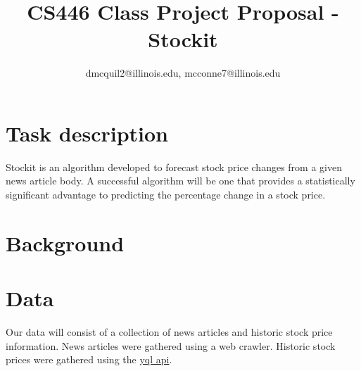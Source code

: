 \documentclass[11pt,letterpaper]{article}
\newcommand{\blue}[1]{\textcolor{RoyalBlue}{#1}}
\newcommand{\instructions}[1]{\blue{\textit{#1}}}
\renewcommand{\instructions}[1]{}
\begin{document}
\title{CS446 Class Project Proposal - Stockit}
\author{dmcquil2@illinois.edu, mcconne7@illinois.edu}
\maketitle



\instructions{If you are taking CS446 for 4 hours credit, you need to
  do a research project.\\
This is a \LaTeX template for the initial proposal,  but should also give you a start on the final report.\\
The blue pieces of text  in this template are either instructions ({\tt$\backslash$instructions\{...\}}) or indicate where you need to fill in something ({\tt$\backslash$fillme\{...\}}).  
You should replace all the {\tt$\backslash$fillme\{...\}} commands with your own text.
To make the instructions disappear, please uncomment the 
\begin{center}
{\tt$\backslash$renewcommand\{$\backslash$instructions\}[1]\{\}}\\
\end{center}
lines in the preamble (just above  {\tt $\backslash$begin\{document\}} of this .tex file) by removing the leading \% marks, 
recompile (run \LaTeX again) and submit the PDF on Compass.\\
The template for the final report is at
\url{http://courses.engr.illinois.edu/cs446/Projects/CS446proj.tex}
(or
\url{http://courses.engr.illinois.edu/cs446/Projects/CS446proj.pdf}
for the pdf)
}
\section*{Task description}
  Stockit is an algorithm developed to forecast stock price changes from
  a given news article body. A successful algorithm will be one that provides
  a statistically significant advantage to predicting the percentage change
  in a stock price.
\instructions{Describe the task you want to tackle in your project.}

\section*{Background}
\instructions{Has there been any prior work on this task? If so,
  provide references where available}

\section*{Data}
  Our data will consist of a collection of news articles and historic
  stock price information. News articles were gathered using a web crawler.
  Historic stock prices were gathered using the
  \href{https://developer.yahoo.com/yql}{yql api}.
  
\end{document}
